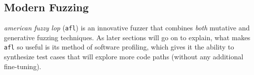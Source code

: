 \subsection{Modern Fuzzing}

\textit{american fuzzy lop}\cite{afl-main} (\texttt{afl}) is an innovative fuzzer
that combines \textit{both} mutative and generative fuzzing techniques.
As later sections will go on to explain, what makes \texttt{afl} so useful is its method of software profiling, which gives it the ability to synthesize test cases that will explore more code paths (without any additional fine-tuning).
